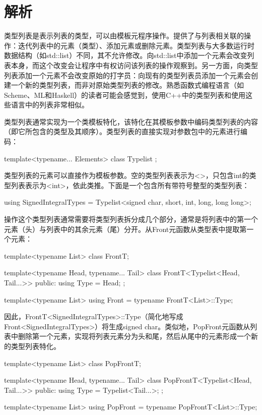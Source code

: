 \section{解析}
类型列表是表示列表的类型，可以由模板元程序操作。提供了与列表相关联的操作：迭代列表中的元素（类型）、添加元素或删除元素。类型列表与大多数运行时数据结构（如std::list）不同，其不允许修改。向std::list中添加一个元素会改变列表本身，而这个改变会让程序中有权访问该列表的操作观察到。另一方面，向类型列表添加一个元素不会改变原始的打字员：向现有的类型列表员添加一个元素会创建一个新的类型列表，而非对原始类型列表的修改。熟悉函数式编程语言（如Scheme、ML和Haskell）的读者可能会感觉到，使用C++中的类型列表和使用这些语言中的列表非常相似。

类型列表通常实现为一个类模板特化，该特化在其模板参数中编码类型列表的内容（即它所包含的类型及其顺序）。类型列表的直接实现对参数包中的元素进行编码：

\begin{cpp}
template<typename... Elements>
class Typelist {};
\end{cpp}

类型列表的元素可以直接作为模板参数。空的类型列表表示为<>，只包含int的类型列表表示为<int>，依此类推。下面是一个包含所有带符号整型的类型列表：

\begin{cpp}
using SignedIntegralTypes =
			Typelist<signed char, short, int, long, long long>;
\end{cpp}

操作这个类型列表通常需要将类型列表拆分成几个部分，通常是将列表中的第一个元素（头）与列表中的其余元素（尾）分开。从Front元函数从类型表中提取第一个元素：

\begin{cpp}
template<typename List>
class FrontT;

template<typename Head, typename... Tail>
class FrontT<Typelist<Head, Tail...>> {
	public:
	using Type = Head;
};

template<typename List>
using Front = typename FrontT<List>::Type;
\end{cpp}

因此，FrontT<SignedIntegralTypes>::Type（简化地写成Front<SignedIntegralTypes>）将生成signed char。类似地，PopFront元函数从列表中删除第一个元素，实现将列表元素分为头和尾，然后从尾中的元素形成一个新的类型列表特化。

\begin{cpp}
template<typename List>
class PopFrontT;

template<typename Head, typename... Tail>
class PopFrontT<Typelist<Head, Tail...>> {
	public:
	using Type = Typelist<Tail...>;
};

template<typename List>
using PopFront = typename PopFrontT<List>::Type;
\end{cpp}

